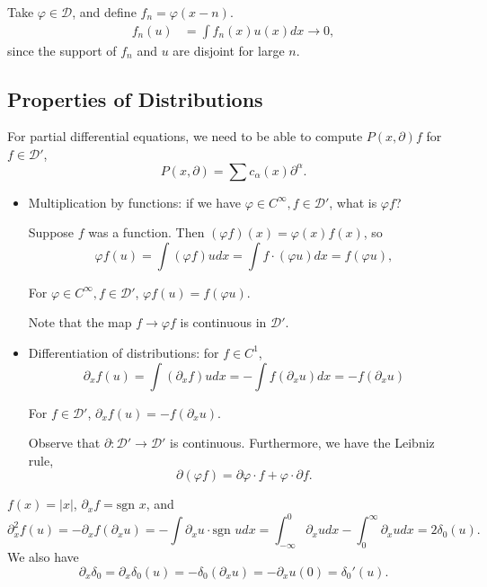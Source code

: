\documentclass[12pt]{scrartcl}
\let \phi \varphi
\begin{document}
\begin{example} Take $\phi \in \mathcal D$, and define $f_n = \phi(x-n)$.  
\begin{align*}
f_n(u) &= \int f_n(x) u(x)dx \rightarrow 0,
\end{align*}
since the support of $f_n$ and $u$ are disjoint for large $n$.
\end{example}
\subsection{Properties of Distributions}
For partial differential equations, we need to be able to compute $P(x, \partial)f$ for $f \in \mathcal D'$,
$$P(x, \partial) = \sum c_\alpha(x) \partial^\alpha.$$

\begin{itemize}
\item Multiplication by functions: if we have $\phi \in C^{\infty}, f \in \mathcal D'$, what is $\phi f$?

Suppose $f$ was a function.  Then $(\phi f)(x) = \phi(x)f(x)$, so
$$\phi f(u) = \int (\phi f)udx = \int f \cdot (\phi u)dx = f(\phi u),$$
\begin{definition} For $\phi \in C^{\infty}, f \in \mathcal D'$, $\phi f(u) = f(\phi u)$.
\end{definition}
Note that the map $f \rightarrow \phi f$ is continuous in $\mathcal D'$.
\item Differentiation of distributions:  for $f \in C^1$, 
$$\partial_x f(u) = \int (\partial_x f) u dx = -\int f (\partial_x u)dx = -f(\partial_x u)$$
\begin{definition} For $f \in \mathcal D'$, $\partial_x f(u) = -f(\partial_x u).$
\end{definition}
Observe that $\partial: \mathcal D' \rightarrow \mathcal D'$ is continuous.  Furthermore, we have the Leibniz rule,
$$\partial(\phi f) = \partial \phi \cdot f + \phi \cdot \partial f.$$
\end{itemize}
\begin{example} $f(x) = |x|$, $\partial_x f = \text{sgn }x$, and 
$$\partial_x^2 f(u) = - \partial_x f(\partial_x u) = - \int \partial_x u \cdot \text{sgn }u dx = \int_{-\infty}^0 \partial_x u dx - \int_{0}^\infty  \partial_x u dx = 2 \delta_0(u).$$
We also have 
$$\partial_x \delta_0 = \partial_x \delta_0(u) = -\delta_0(\partial_x u) = -\partial_x u(0) = \delta_0'(u).$$
\end{example}
\end{document}
